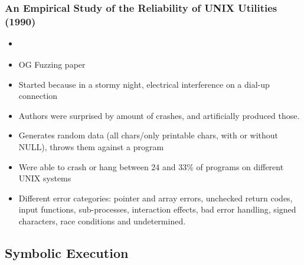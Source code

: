 \documentclass[12pt]{article}
\begin{document}
\subsubsection{An Empirical Study of the Reliability of UNIX Utilities (1990)}
\begin{itemize}
    \item \cite{UNIX}
    \item OG Fuzzing paper
    \item Started because in a stormy night, electrical interference on a dial-up connection
    \item Authors were surprised by amount of crashes, and artificially produced those.
    \item Generates random data (all chars/only printable chars, with or without NULL), throws them against a program
    \item Were able to crash or hang between 24 and 33\% of programs on different UNIX systems
    \item Different error categories: pointer and array errors, unchecked return codes, input functions, sub-processes, interaction effects, bad error handling, signed characters, race conditions and undetermined.
\end{itemize}

\subsection{Symbolic Execution}
\end{document}
